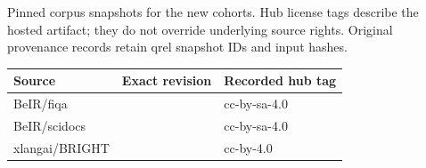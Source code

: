 \begin{supplementtable}\caption{Pinned corpus snapshots for the new cohorts. Hub license tags describe the hosted artifact; they do not override underlying source rights. Original provenance records retain qrel snapshot IDs and input hashes.}\label{tab:si-corpus}
\sncstable
\begin{tabularx}{\linewidth}{@{}lYY@{}}\toprule
Source & Exact revision & Recorded hub tag \\\midrule
BeIR/fiqa & {\ttfamily{}} & cc-by-sa-4.0 \\
BeIR/scidocs & {\ttfamily{}} & cc-by-sa-4.0 \\
xlangai/BRIGHT & {\ttfamily{}} & cc-by-4.0 \\
\bottomrule\end{tabularx}\end{supplementtable}